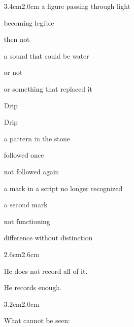 \begin{adjustwidth}{3.4cm}{2.0cm}
\noindent a figure passing through light

\noindent becoming legible

\noindent then not

\noindent {}

\vspace{1em}

\noindent a sound that could be water

\noindent or not

\noindent or something that replaced it

\noindent Drip

\noindent {}

\noindent Drip

\vspace{1em}

\noindent a pattern in the stone

\noindent followed once

\noindent not followed again

\noindent {}

\vspace{1em}

\noindent a mark in a script no longer recognized

\noindent {}

\noindent a second mark

\noindent not functioning

\vspace{1em}

\noindent {}

\noindent difference without distinction

\vspace{2em}

\end{adjustwidth}

\begin{adjustwidth}{2.6cm}{2.6cm}

He does not record all of it.

\vspace{1em}

He records enough.

\vspace{2em}

\end{adjustwidth}

\begin{adjustwidth}{3.2cm}{2.0cm}

\noindent What cannot be seen:

\vspace{1.5em}

\end{adjustwidth}

